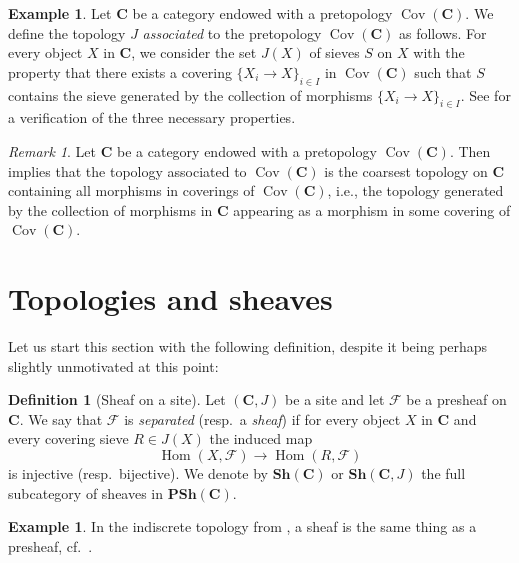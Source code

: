 \documentclass[12pt,reqno,a4paper]{amsart}
\theoremstyle{plain}
\theoremstyle{definition}
\newtheorem{defn}[thm]{Definition}
\newtheorem{exmp}[thm]{Example}
\theoremstyle{remark}
\newtheorem{rem}[thm]{Remark}
\begin{document}
\begin{exmp}\label{exmp:associated}
  Let $\mathbf{C}$ be a category endowed with a pretopology $\operatorname{Cov}(\mathbf{C})$.
  We define the topology $J$ \textit{associated} to the pretopology $\operatorname{Cov}(\mathbf{C})$ as follows.
  For every object $X$ in $\mathbf{C}$, we consider the set $J(X)$ of sieves $S$ on $X$ with the property that there exists a covering $\{ X_{i} \to X\}_{i \in I}$ in $\operatorname{Cov}(\mathbf{C})$ such that $S$ contains the sieve generated by the collection of morphisms $\{ X_{i} \to X \}_{i \in I}$.
  See \cite[Exposé II, Proposition 1.4]{sga4} for a verification of the three necessary properties.
\end{exmp}

\begin{rem}\label{rem:associated}
  Let $\mathbf{C}$ be a category endowed with a pretopology $\operatorname{Cov}(\mathbf{C})$.
  Then  implies that the topology associated to $\operatorname{Cov}(\mathbf{C})$ is the coarsest topology on $\mathbf{C}$ containing all morphisms in coverings of $\operatorname{Cov}(\mathbf{C})$, i.e., the topology generated by the collection of morphisms in $\mathbf{C}$ appearing as a morphism in some covering of $\operatorname{Cov}(\mathbf{C})$.
\end{rem}

\section{Topologies and sheaves}

Let us start this section with the following definition, despite it being perhaps slightly unmotivated at this point:

\begin{defn}[Sheaf on a site]
  Let $(\mathbf{C},J)$ be a site and let $\mathscr{F}$ be a presheaf on $\mathbf{C}$.
  We say that $\mathscr{F}$ is \textit{separated} (resp.~a \textit{sheaf}) if for every object $X$ in $\mathbf{C}$ and every covering sieve $R \in J(X)$ the induced map
  \[ \operatorname{Hom}(X,\mathscr{F}) \to \operatorname{Hom}(R,\mathscr{F}) \]
  is injective (resp.~bijective).
  We denote by $\mathbf{Sh}(\mathbf{C})$ or $\mathbf{Sh}(\mathbf{C},J)$ the full subcategory of sheaves in $\mathbf{PSh}(\mathbf{C})$.
\end{defn}

\begin{exmp}\label{exmp:indiscretesheaf}
  In the indiscrete topology from , a sheaf is the same thing as a presheaf, cf.~.
\end{exmp}
\end{document}
